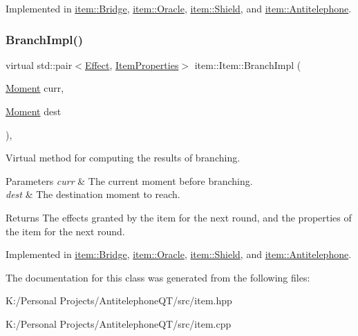 Implemented in \hyperlink{classitem_1_1_bridge_a08aa3fdb36e203e489bc0af65dde451c}{item\+::\+Bridge}, \hyperlink{classitem_1_1_oracle_af765dd1df5a43de79539f9ce960854c0}{item\+::\+Oracle}, \hyperlink{classitem_1_1_shield_a0c446c3f436c4eb221ebafd817df9a5f}{item\+::\+Shield}, and \hyperlink{classitem_1_1_antitelephone_aa59b4569bac948f37fd15dbea234503f}{item\+::\+Antitelephone}.

\mbox{\label{classitem_1_1_item_afef6bdd5c1c734c67122e4118e9e1930}} 
\subsubsection{\texorpdfstring{Branch\+Impl()}{BranchImpl()}}
{\footnotesize\ttfamily virtual std\+::pair$<$\hyperlink{classitem_1_1_effect}{Effect}, \hyperlink{classitem_1_1_item_properties}{Item\+Properties}$>$ item\+::\+Item\+::\+Branch\+Impl (\begin{DoxyParamCaption}\item[{\hyperlink{classtimeplane_1_1_moment}{Moment}}]{curr,  }\item[{\hyperlink{classtimeplane_1_1_moment}{Moment}}]{dest }\end{DoxyParamCaption})\hspace{0.3cm}{\ttfamily [protected]}, {}}



Virtual method for computing the results of branching. 


\begin{DoxyParams}{Parameters}
{\em curr} & The current moment before branching. \\
\hline
{\em dest} & The destination moment to reach. \\
\hline
\end{DoxyParams}
\begin{DoxyReturn}{Returns}
The effects granted by the item for the next round, and the properties of the item for the next round. 
\end{DoxyReturn}


Implemented in \hyperlink{classitem_1_1_bridge_a175b2a911174c682ea163bc248836a87}{item\+::\+Bridge}, \hyperlink{classitem_1_1_oracle_a9a8911eef902d4dcca95f111fda7c5d0}{item\+::\+Oracle}, \hyperlink{classitem_1_1_shield_a29993d7965fe391d052214cd415eec75}{item\+::\+Shield}, and \hyperlink{classitem_1_1_antitelephone_a1b094baeb7cae7e1161d1aa1650022d1}{item\+::\+Antitelephone}.



The documentation for this class was generated from the following files\+:\begin{DoxyCompactItemize}
\item 
K\+:/\+Personal Projects/\+Antitelephone\+Q\+T/src/item.\+hpp\item 
K\+:/\+Personal Projects/\+Antitelephone\+Q\+T/src/item.\+cpp\end{DoxyCompactItemize}
